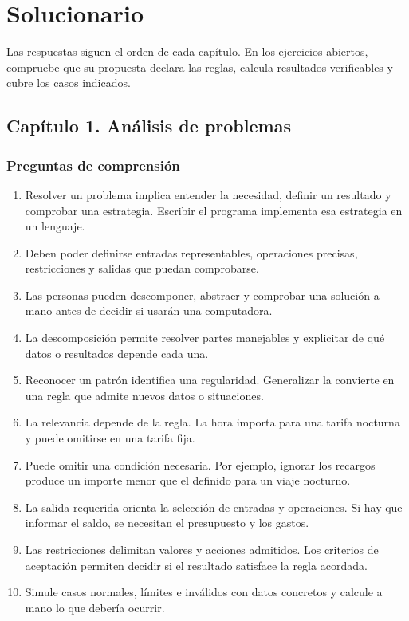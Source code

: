 \chapter{Solucionario}\label{anexo:solucionario}

Las respuestas siguen el orden de cada capítulo. En los ejercicios abiertos, compruebe que su propuesta declara las reglas, calcula resultados verificables y cubre los casos indicados.

\section{Capítulo 1. Análisis de problemas}

\subsection{Preguntas de comprensión}

\begin{enumerate}
\item Resolver un problema implica entender la necesidad, definir un resultado y comprobar una estrategia. Escribir el programa implementa esa estrategia en un lenguaje.
\item Deben poder definirse entradas representables, operaciones precisas, restricciones y salidas que puedan comprobarse.
\item Las personas pueden descomponer, abstraer y comprobar una solución a mano antes de decidir si usarán una computadora.
\item La descomposición permite resolver partes manejables y explicitar de qué datos o resultados depende cada una.
\item Reconocer un patrón identifica una regularidad. Generalizar la convierte en una regla que admite nuevos datos o situaciones.
\item La relevancia depende de la regla. La hora importa para una tarifa nocturna y puede omitirse en una tarifa fija.
\item Puede omitir una condición necesaria. Por ejemplo, ignorar los recargos produce un importe menor que el definido para un viaje nocturno.
\item La salida requerida orienta la selección de entradas y operaciones. Si hay que informar el saldo, se necesitan el presupuesto y los gastos.
\item Las restricciones delimitan valores y acciones admitidos. Los criterios de aceptación permiten decidir si el resultado satisface la regla acordada.
\item Simule casos normales, límites e inválidos con datos concretos y calcule a mano lo que debería ocurrir.
\end{enumerate}

